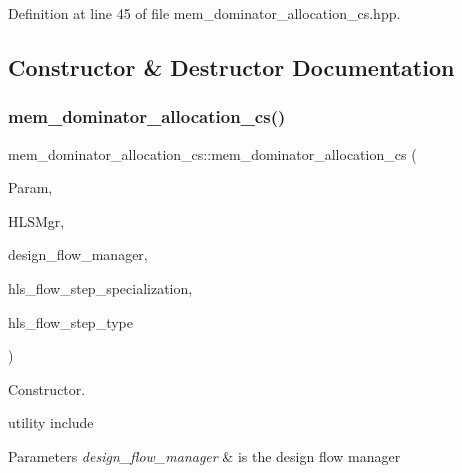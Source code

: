 Definition at line 45 of file mem\+\_\+dominator\+\_\+allocation\+\_\+cs.\+hpp.



\subsection{Constructor \& Destructor Documentation}
\mbox{\label{classmem__dominator__allocation__cs_a2ce0a208ce3b49c9aa8811b5e50fb2d2}} 
\subsubsection{\texorpdfstring{mem\+\_\+dominator\+\_\+allocation\+\_\+cs()}{mem\_dominator\_allocation\_cs()}}
{\footnotesize\ttfamily mem\+\_\+dominator\+\_\+allocation\+\_\+cs\+::mem\+\_\+dominator\+\_\+allocation\+\_\+cs (\begin{DoxyParamCaption}\item[{const \hyperlink{Parameter_8hpp_a37841774a6fcb479b597fdf8955eb4ea}{Parameter\+Const\+Ref}}]{Param,  }\item[{const \hyperlink{hls__manager_8hpp_acd3842b8589fe52c08fc0b2fcc813bfe}{H\+L\+S\+\_\+manager\+Ref}}]{H\+L\+S\+Mgr,  }\item[{const Design\+Flow\+Manager\+Const\+Ref}]{design\+\_\+flow\+\_\+manager,  }\item[{const \hyperlink{hls__step_8hpp_a5fdd2edf290c196531d21d68e13f0e74}{H\+L\+S\+Flow\+Step\+Specialization\+Const\+Ref}}]{hls\+\_\+flow\+\_\+step\+\_\+specialization,  }\item[{const \hyperlink{hls__step_8hpp_ada16bc22905016180e26fc7e39537f8d}{H\+L\+S\+Flow\+Step\+\_\+\+Type}}]{hls\+\_\+flow\+\_\+step\+\_\+type }\end{DoxyParamCaption})}



Constructor. 

utility include


\begin{DoxyParams}{Parameters}
{\em design\+\_\+flow\+\_\+manager} & is the design flow manager \\
\hline
\end{DoxyParams}


